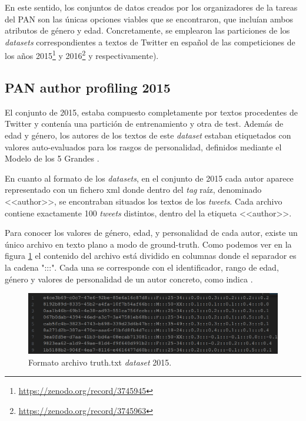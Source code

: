 En este sentido, los conjuntos de datos creados por los organizadores de la tareas del PAN son las únicas opciones viables que se encontraron, que incluían ambos atributos de género y edad. Concretamente, se emplearon las particiones de los \textit{datasets} correspondientes a textos de Twitter en español de las competiciones de los años 2015\footnote{\url{https://zenodo.org/record/3745945}} y 2016\footnote{\url{https://zenodo.org/record/3745963}} \citep{pan:2015} y \citep{pan:2016} respectivamente).
 
\subsection{PAN author profiling 2015}
\label{subsec:pan15}

 El conjunto de 2015, estaba compuesto completamente por textos procedentes de Twitter y contenía una partición de entrenamiento y otra de test. Además de edad y género, los autores de los textos de este \textit{dataset} estaban etiquetados con valores auto-evaluados para los rasgos de personalidad, definidos mediante el Modelo de los 5 Grandes \citep{5grandes}.

 En cuanto al formato de los \textit{datasets}, en el conjunto de 2015 cada autor aparece representado con un fichero \acrfull{xml} donde dentro del \textit{tag} raíz, denominado <<author>>, se encontraban situados los textos de los \textit{tweets}. Cada archivo contiene exactamente 100 \textit{tweets} distintos, dentro del la etiqueta <<author>>.
 
 Para conocer los valores de género, edad, y personalidad de cada autor, existe un único archivo en texto plano a modo de \gls{ground-truth}. Como podemos ver en la figura \ref{fig:formato-dataset} el contenido del archivo está dividido en columnas donde el separador es la cadena ":::". Cada una se corresponde con el identificador, rango de edad, género y valores de personalidad de un autor concreto, como indica \citet{dataset:15}.
 
 \begin{figure}[hp!]
  \centering
    \includegraphics[width=\textwidth]{imaxes/formato_dataset.png}
  \caption{Formato archivo truth.txt \textit{dataset} 2015.}
  \label{fig:formato-dataset}
\end{figure}

